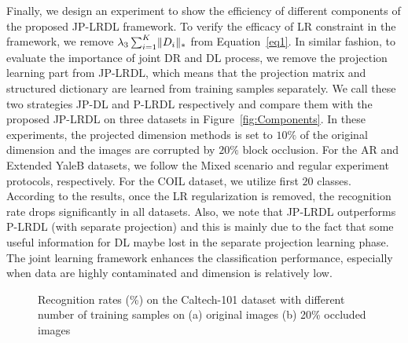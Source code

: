 \documentclass[journal]{IEEEtran}
\DeclarePairedDelimiter\norm{\lVert}{\rVert}
\begin{document}
Finally, we design an experiment to show the efficiency of different components of the proposed JP-LRDL framework. To verify the efficacy of LR constraint in the framework, we remove $\lambda_3 \sum_{\substack{i=1}}^K \norm[]{D_i}_{*}$ from Equation~\eqref{eq1}. In similar fashion, to evaluate the importance of joint DR and DL process, we remove the projection learning part from JP-LRDL, which means that the projection matrix and structured dictionary are learned from training samples separately. We call these two strategies JP-DL and P-LRDL respectively and compare them with the proposed JP-LRDL on three datasets in Figure~\ref{fig:Components}. In these experiments, the projected dimension methods is set to $10\%$ of the original dimension and the images are corrupted by $20\%$ block occlusion. For the AR and Extended YaleB datasets, we follow the Mixed scenario and regular experiment protocols, respectively. For the COIL dataset, we utilize first $20$ classes. According to the results, once the LR regularization is removed, the recognition rate drops significantly in all datasets. Also, we note that JP-LRDL outperforms P-LRDL (with separate projection) and this is mainly due to the fact that some useful information for DL maybe lost in the separate projection learning phase. The joint learning framework enhances the classification performance, especially when data are highly contaminated and dimension is relatively low.
\begin{figure}[t]
\centering
{}  
\hspace{2pt}
\caption{Recognition rates (\%) on the Caltech-101 dataset with different number of training samples on (a) original images (b) 20\% occluded images}
\vspace{-1.5em}
\end{figure} 
\end{document}
